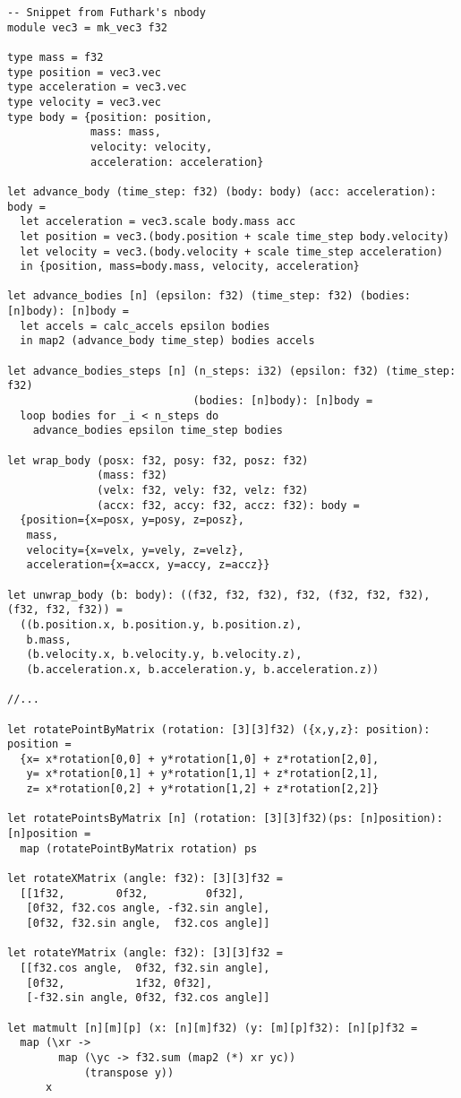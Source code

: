 \begin{lstlisting}[language=Futhark]
-- Snippet from Futhark's nbody
module vec3 = mk_vec3 f32

type mass = f32
type position = vec3.vec
type acceleration = vec3.vec
type velocity = vec3.vec
type body = {position: position,
             mass: mass,
             velocity: velocity,
             acceleration: acceleration}

let advance_body (time_step: f32) (body: body) (acc: acceleration): body =
  let acceleration = vec3.scale body.mass acc
  let position = vec3.(body.position + scale time_step body.velocity)
  let velocity = vec3.(body.velocity + scale time_step acceleration)
  in {position, mass=body.mass, velocity, acceleration}

let advance_bodies [n] (epsilon: f32) (time_step: f32) (bodies: [n]body): [n]body =
  let accels = calc_accels epsilon bodies
  in map2 (advance_body time_step) bodies accels

let advance_bodies_steps [n] (n_steps: i32) (epsilon: f32) (time_step: f32)
                             (bodies: [n]body): [n]body =
  loop bodies for _i < n_steps do
    advance_bodies epsilon time_step bodies

let wrap_body (posx: f32, posy: f32, posz: f32)
              (mass: f32)
              (velx: f32, vely: f32, velz: f32)
              (accx: f32, accy: f32, accz: f32): body =
  {position={x=posx, y=posy, z=posz},
   mass,
   velocity={x=velx, y=vely, z=velz},
   acceleration={x=accx, y=accy, z=accz}}

let unwrap_body (b: body): ((f32, f32, f32), f32, (f32, f32, f32), (f32, f32, f32)) =
  ((b.position.x, b.position.y, b.position.z),
   b.mass,
   (b.velocity.x, b.velocity.y, b.velocity.z),
   (b.acceleration.x, b.acceleration.y, b.acceleration.z))

//...

let rotatePointByMatrix (rotation: [3][3]f32) ({x,y,z}: position): position =
  {x= x*rotation[0,0] + y*rotation[1,0] + z*rotation[2,0],
   y= x*rotation[0,1] + y*rotation[1,1] + z*rotation[2,1],
   z= x*rotation[0,2] + y*rotation[1,2] + z*rotation[2,2]}

let rotatePointsByMatrix [n] (rotation: [3][3]f32)(ps: [n]position): [n]position =
  map (rotatePointByMatrix rotation) ps

let rotateXMatrix (angle: f32): [3][3]f32 =
  [[1f32,        0f32,         0f32],
   [0f32, f32.cos angle, -f32.sin angle],
   [0f32, f32.sin angle,  f32.cos angle]]

let rotateYMatrix (angle: f32): [3][3]f32 =
  [[f32.cos angle,  0f32, f32.sin angle],
   [0f32,           1f32, 0f32],
   [-f32.sin angle, 0f32, f32.cos angle]]

let matmult [n][m][p] (x: [n][m]f32) (y: [m][p]f32): [n][p]f32 =
  map (\xr ->
        map (\yc -> f32.sum (map2 (*) xr yc))
            (transpose y))
      x
\end{lstlisting}
